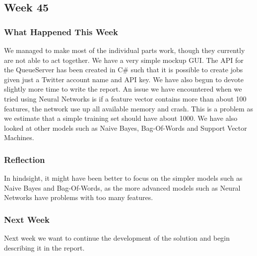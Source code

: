 \subsection{Week 45}
\subsubsection{What Happened This Week}
We managed to make most of the individual parts work, though they currently are
not able to act together. We have a very simple mockup \ac{GUI}. The \ac{API}
for the QueueServer has been created in C\# such that it is possible to create
jobs given just a Twitter account name and \ac{API} key. We have also begun to
devote slightly more time to write the report. An issue we have encountered when
we tried using Neural Networks is if a feature vector contains more than about
100 features, the network use up all available memory and crash. This is a
problem as we estimate that a simple training set should have about 1000. We
have also looked at other models such as Naive Bayes, Bag-Of-Words and Support
Vector Machines.

\subsubsection{Reflection} 
In hindsight, it might have been better to focus on the simpler models such as
Naive Bayes and Bag-Of-Words, as the more advanced models such as Neural
Networks have problems with too many features. 

\subsubsection{Next Week}
Next week we want to continue the development of the solution and begin
describing it in the report.


